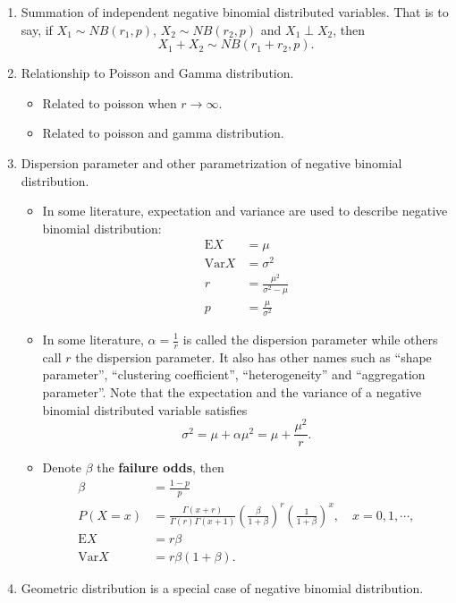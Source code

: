 \documentclass[a4paper,12pt]{article}
\begin{document}
\begin{enumerate}
\item Summation of independent negative binomial distributed variables. That is to say, if $X_1 \sim NB\left(r_1, p\right)$, $X_2 \sim NB\left(r_2, p\right)$ and $X_1 \perp X_2$, then
  \[
    X_1 + X_2 \sim NB\left(r_1 + r_2, p\right)
    .
  \]
\item Relationship to Poisson and Gamma distribution.
  \begin{itemize}
  \item Related to poisson when $r\to\infty$.
  \item Related to poisson and gamma distribution.
  \end{itemize}
\item Dispersion parameter and other parametrization of negative binomial distribution.
  \begin{itemize}
  \item In some literature, expectation and variance are used to describe negative binomial distribution:
    \[
      \begin{aligned}
        \mathrm{E}X &= \mu    \\
        \mathrm{Var}X &= \sigma^2    \\
        r &= \frac{\mu^2}{\sigma^2 - \mu}    \\
        p &= \frac{\mu}{\sigma^2}
      \end{aligned}
    \]
  \item In some literature, $\alpha = \frac{1}{r}$ is called the dispersion parameter while others call $r$ the dispersion parameter. It also has other names such as ``shape parameter'', ``clustering coefficient'', ``heterogeneity'' and ``aggregation parameter''. Note that the expectation and the variance of a negative binomial distributed variable satisfies
    \[
      \sigma^2 = \mu + \alpha \mu^2 = \mu + \frac{\mu^2}{r}
      .
    \]
  \item Denote $\beta$ the \textbf{failure odds}, then
    \[
      \begin{aligned}
        \beta &= \frac{1- p}{p}    \\
        P\left(X = x\right) &=
        \frac{\Gamma\left(x + r\right)}{\Gamma\left(r\right)\Gamma\left(x + 1\right)}
        \left(\frac{\beta}{1 + \beta}\right)^r
        \left(\frac{1}{1 + \beta}\right)^x,
        \quad x = 0, 1, \cdots,    \\
        \mathrm{E}X &= r\beta    \\
        \mathrm{Var}X &= r\beta\left(1 + \beta\right).
      \end{aligned}
    \]
  \end{itemize}
\item Geometric distribution is a special case of negative binomial distribution.
\end{enumerate}
\end{document}
